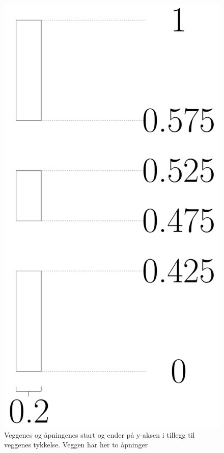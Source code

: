 \documentclass[reprint,english,notitlepage]{revtex4-2}  %
\begin{document}
\begin{figure}[H]
	\centering 
	\includegraphics[scale=0.1]{../Images/NewWalls.pdf}
	\caption{Veggenes og åpningenes start og ender på y-aksen i tillegg til veggenes tykkelse. Veggen har her to åpninger}
	\label{fig:Wall2}
\end{figure}
\end{document}
